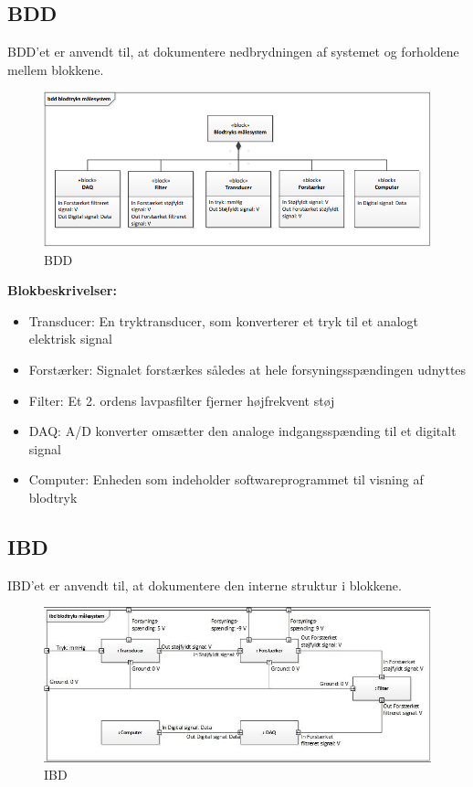 \subsection{BDD}
BDD'et er anvendt til, at dokumentere nedbrydningen af systemet og forholdene mellem blokkene.  

\begin{figure}[H]
\centering
\includegraphics[scale=0.80]{bdd.PNG}
\caption{BDD}
\end{figure}

\textbf{Blokbeskrivelser:}
\begin{itemize}
\item Transducer: En tryktransducer, som konverterer et tryk til et analogt elektrisk signal
\item Forstærker: Signalet forstærkes således at hele forsyningsspændingen udnyttes
\item Filter: Et 2. ordens lavpasfilter fjerner højfrekvent støj
\item DAQ: A/D konverter omsætter den analoge indgangsspænding til et digitalt signal
\item Computer: Enheden som indeholder softwareprogrammet til visning af blodtryk
\end{itemize}

\newpage

\subsection{IBD}
IBD'et er anvendt til, at dokumentere den interne struktur i blokkene.
\begin{figure}[H]
\centering
\includegraphics[scale=0.75]{ibd.PNG}
\caption{IBD}
\end{figure}

